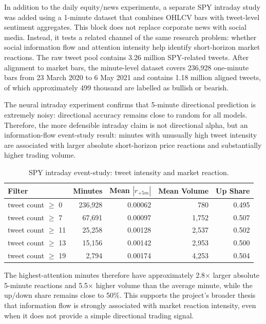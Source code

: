 \documentclass[12pt, a4paper]{article}
\begin{document}
In addition to the daily equity/news experiments, a separate SPY intraday study was added using a 1-minute dataset that combines OHLCV bars with tweet-level sentiment aggregates. This block does not replace corporate news with social media. Instead, it tests a related channel of the same research problem: whether social information flow and attention intensity help identify short-horizon market reactions. The raw tweet pool contains 3.26 million SPY-related tweets. After alignment to market bars, the minute-level dataset covers 236{,}928 one-minute bars from 23 March 2020 to 6 May 2021 and contains 1.18 million aligned tweets, of which approximately 499 thousand are labelled as bullish or bearish.

The neural intraday experiment confirms that 5-minute directional prediction is extremely noisy: directional accuracy remains close to random for all models. Therefore, the more defensible intraday claim is not directional alpha, but an information-flow event-study result: minutes with unusually high tweet intensity are associated with larger absolute short-horizon price reactions and substantially higher trading volume.

\begin{table}[htbp]
\centering
\caption{SPY intraday event-study: tweet intensity and market reaction.}
\label{tab:spy_event_study}
\begin{tabular}{lrrrr}
\toprule
\textbf{Filter} & \textbf{Minutes} & \textbf{Mean $|r_{+5m}|$} & \textbf{Mean Volume} & \textbf{Up Share} \\
\midrule
tweet count $\geq$ 0  & 236{,}928 & 0.00062 & 780  & 0.495 \\
tweet count $\geq$ 7  & 67{,}691  & 0.00097 & 1{,}752 & 0.507 \\
tweet count $\geq$ 11 & 25{,}258  & 0.00128 & 2{,}537 & 0.502 \\
tweet count $\geq$ 13 & 15{,}156  & 0.00142 & 2{,}953 & 0.500 \\
tweet count $\geq$ 19 & 2{,}794   & 0.00174 & 4{,}253 & 0.504 \\
\bottomrule
\end{tabular}
\end{table}

The highest-attention minutes therefore have approximately 2.8$\times$ larger absolute 5-minute reactions and 5.5$\times$ higher volume than the average minute, while the up/down share remains close to 50\%. This supports the project's broader thesis that information flow is strongly associated with market reaction intensity, even when it does not provide a simple directional trading signal.
\end{document}
